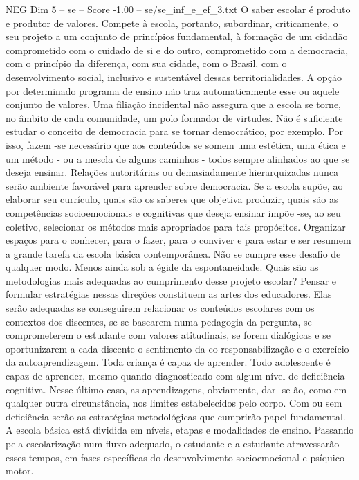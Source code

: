 \begin{textsample}{NEG Dim 5 – se – Score -1.00 – se/se\_inf\_e\_ef\_3.txt}  \label{ex:f5_neg_157}
O saber escolar é produto e produtor de valores.
Compete à escola, portanto, subordinar, criticamente, o seu projeto a um conjunto de princípios fundamental, à formação de um cidadão comprometido com o cuidado de si e do outro, comprometido com a democracia, com o princípio da diferença, com sua cidade, com o Brasil, com o desenvolvimento social, inclusivo e sustentável dessas territorialidades.
A opção por determinado programa de ensino não traz automaticamente esse ou aquele conjunto de valores.
Uma filiação incidental não assegura que a escola se torne, no âmbito de cada comunidade, um polo formador de virtudes.
Não é suficiente estudar o conceito de democracia para se tornar democrático, por exemplo.
Por isso, fazem -se necessário que aos conteúdos se somem uma estética, uma ética e um método - ou a mescla de alguns caminhos - todos sempre alinhados ao que se deseja ensinar.
Relações autoritárias ou demasiadamente hierarquizadas nunca serão ambiente favorável para aprender sobre democracia.
Se a escola supõe, ao elaborar seu currículo, quais são os saberes que objetiva produzir, quais são as competências socioemocionais e cognitivas que deseja ensinar impõe -se, ao seu coletivo, selecionar os métodos mais apropriados para tais propósitos.
Organizar espaços para o conhecer, para o fazer, para o conviver e para estar e ser resumem a grande tarefa da escola básica contemporânea.
Não se cumpre esse desafio de qualquer modo.
Menos ainda sob a égide da espontaneidade.
Quais são as metodologias mais adequadas ao cumprimento desse projeto escolar?
Pensar e formular estratégias nessas direções constituem as artes dos educadores.
Elas serão adequadas se conseguirem relacionar os conteúdos escolares com os contextos dos discentes, se se basearem numa pedagogia da pergunta, se comprometerem o estudante com valores atitudinais, se forem dialógicas e se oportunizarem a cada discente o sentimento da co-responsabilização e o exercício da autoaprendizagem.
Toda criança é capaz de aprender.
Todo adolescente é capaz de aprender, mesmo quando diagnosticado com algum nível de deficiência cognitiva.
Nesse último caso, as aprendizagens, obviamente, dar -se-ão, como em qualquer outra circunstância, nos limites estabelecidos pelo corpo.
Com ou sem deficiência serão as estratégias metodológicas que cumprirão papel fundamental.
A escola básica está dividida em níveis, etapas e modalidades de ensino.
Passando pela escolarização num fluxo adequado, o estudante e a estudante atravessarão esses tempos, em fases específicas do desenvolvimento socioemocional e psíquico-motor.

\end{textsample}
